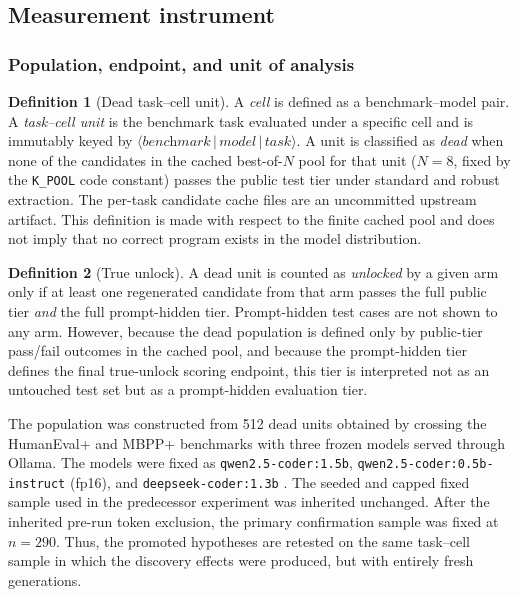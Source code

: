 \documentclass{article}
\numberwithin{equation}{section}  %
\theoremstyle{definition}
\newtheorem{definition}{Definition}
\begin{document}
\subsection{Measurement instrument}
\label{sec:design}

\subsubsection{Population, endpoint, and unit of analysis}
\label{sec:regime}

\begin{definition}[Dead task--cell unit]
\label{def:dead}
A \emph{cell} is defined as a benchmark--model pair. A \emph{task--cell unit} is the
benchmark task evaluated under a specific cell and is immutably keyed by
$\langle\textit{benchmark}\,|\,\textit{model}\,|\,\textit{task}\rangle$.
A unit is classified as \emph{dead} when none of the candidates in the cached best-of-$N$
pool for that unit ($N=8$, fixed by the \texttt{K\_POOL} code constant) passes the public
test tier under standard and robust extraction. The per-task candidate cache files are an
uncommitted upstream artifact. This definition is made with respect to the finite cached pool
and does not imply that no correct program exists in the model distribution.

\end{definition}

\begin{definition}[True unlock]
\label{def:unlock}
A dead unit is counted as \emph{unlocked} by a given arm only if at least one regenerated
candidate from that arm passes the full public tier \emph{and} the full prompt-hidden tier.
Prompt-hidden test cases are not shown to any arm. However, because the dead population is
defined only by public-tier pass/fail outcomes in the cached pool, and because the
prompt-hidden tier defines the final true-unlock scoring endpoint, this tier is interpreted
not as an untouched test set but as a prompt-hidden evaluation tier.
\end{definition}

The population was constructed from 512 dead units obtained by crossing the HumanEval+ and
MBPP+ benchmarks \citep{chen2021humaneval,austin2021mbpp,liu2023evalplus} with three frozen
models served through Ollama. The models were fixed as
\texttt{qwen2.5-coder:1.5b}, \texttt{qwen2.5-coder:0.5b-instruct} (fp16), and
\texttt{deepseek-coder:1.3b} \citep{hui2024qwen25coder,guo2024deepseekcoder}. The seeded
and capped fixed sample used in the predecessor experiment was inherited unchanged. After the
inherited pre-run token exclusion, the primary confirmation sample was fixed at $n=290$.
Thus, the promoted hypotheses are retested on the same task--cell sample in which the
discovery effects were produced, but with entirely fresh generations.
\end{document}
